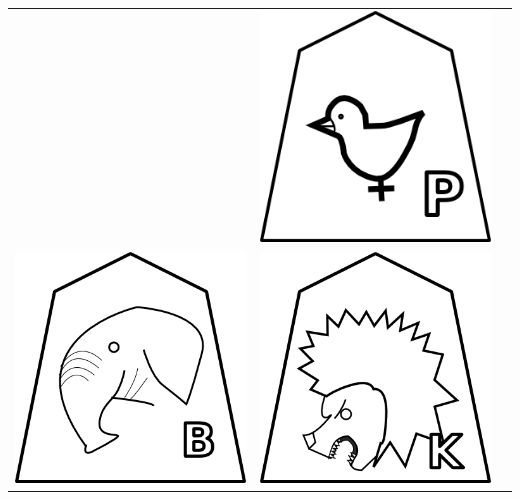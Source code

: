 \documentclass{beamer}
\begin{document}
\begin{frame}
\begin{center}
\begin{tabular}{ccc}
& \includegraphics[scale = 0.2]{../../graphics/Pawn.png} & \\
\includegraphics[scale = 0.2]{../../graphics/Bishop.png} & 
\includegraphics[scale = 0.2]{../../graphics/King.png}&

\end{tabular}
\end{center}
\end{frame}
\end{document}
